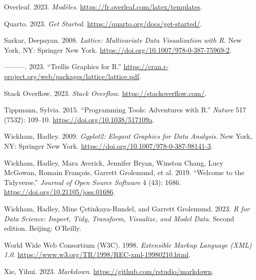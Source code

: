 \documentclass[
  letterpaper,
]{scrbook}
\newlength{\cslhangindent}
\newlength{\cslentryspacingunit} %
\newenvironment{CSLReferences}[2] %
 {%
  \setlength{\parindent}{0pt}
  \ifodd #1
  \let\oldpar\par
  \def\par{\hangindent=\cslhangindent\oldpar}
  \fi
  \setlength{\parskip}{#2\cslentryspacingunit}
 }%
 {}
\begin{document}
\begin{CSLReferences}{1}{0}
\leavevmode{}%
Overleaf. 2023. \emph{Modèles}.
\url{https://fr.overleaf.com/latex/templates}.

\leavevmode{}%
Quarto. 2023. \emph{Get {Started}}.
\url{https://quarto.org/docs/get-started/}.

\leavevmode{}%
Sarkar, Deepayan. 2008. \emph{Lattice: {Multivariate Data Visualization}
with {R}}. {New York, NY}: {Springer New York}.
\url{https://doi.org/10.1007/978-0-387-75969-2}.

\leavevmode{}%
---------. 2023. {``Trellis {Graphics} for {R}.''}
\url{https://cran.r-project.org/web/packages/lattice/lattice.pdf}.

\leavevmode{}%
Stack Overflow. 2023. \emph{Stack {Overflow}}.
\url{https://stackoverflow.com/}.

\leavevmode{}%
Tippmann, Sylvia. 2015. {``Programming Tools: {Adventures} with {R}.''}
\emph{Nature} 517 (7532): 109--10.
\url{https://doi.org/10.1038/517109a}.

\leavevmode{}%
Wickham, Hadley. 2009. \emph{Ggplot2: {Elegant Graphics} for {Data
Analysis}}. {New York, NY}: {Springer New York}.
\url{https://doi.org/10.1007/978-0-387-98141-3}.

\leavevmode{}%
Wickham, Hadley, Mara Averick, Jennifer Bryan, Winston Chang, Lucy
McGowan, Romain François, Garrett Grolemund, et al. 2019. {``Welcome to
the {Tidyverse}.''} \emph{Journal of Open Source Software} 4 (43): 1686.
\url{https://doi.org/10.21105/joss.01686}.

\leavevmode{}%
Wickham, Hadley, Mine Çetinkaya-Rundel, and Garrett Grolemund. 2023.
\emph{R for Data Science: Import, Tidy, Transform, Visualize, and Model
Data}. Second edition. {Beijing}: {O'Reilly}.

\leavevmode{}%
World Wide Web Consortium (W3C). 1998. \emph{Extensible {Markup
Language} ({XML}) 1.0}.
\url{https://www.w3.org/TR/1998/REC-xml-19980210.html}.

\leavevmode{}%
Xie, Yihui. 2023. \emph{Markdown}.
\url{https://github.com/rstudio/markdown}.

\end{CSLReferences}


\backmatter
\end{document}
